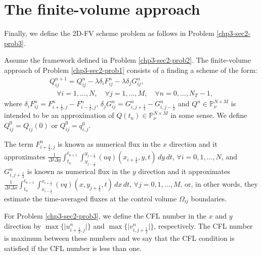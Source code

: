 \section{The finite-volume approach}
\label{sec:fv-2d}
Finally, we define the 2D-FV scheme problem as follows in Problem \ref{chp3-sec2-prob3}.
\begin{prob}[2D-FV scheme]
	\label{chp3-sec2-prob3}
	Assume the framework defined in Problem \ref{chp3-sec2-prob2}.
	The finite-volume approach of Problem \ref{chp3-sec2-prob1}
	consists of a finding a scheme of the form:
	\begin{align}
		\label{chp3-2dfv}
		{Q}_{ij}^{n+1} =  {Q}_{ij}^{n} - {\lambda} \delta_i {F}_{ij}^{n} - {\lambda} \delta_j {G}_{ij}^{n},
		\\ \nonumber \quad \forall i = 1, \ldots, N, \quad \forall j = 1, \ldots, M,
		\quad \forall n = 0, \ldots, N_T-1,
	\end{align}
	where $ \delta_i F_{ij}^n =
    {F}_{i+\frac{1}{2},j}^{n} 
    - {F}_{i-\frac{1}{2},j}^{n}$,
    $ \delta_j G_{ij}^n =
    {G}_{i,j+\frac{1}{2}}^{n} 
    - {G}_{i,j-\frac{1}{2}}^{n}$ 
    and ${Q}^{n}\in \mathbb{P}^{N\times M}_{\nu}$ is intended to be an approximation
	of ${Q}(t_{n})\in \mathbb{P}^{N\times M}_{\nu}$ in some sense. We define ${Q}_{ij}^{0} = {Q}_{ij}(0)$ or
	${Q}_{ij}^{0} = {q}^0_{i,j}$.
    
    The term ${F}_{i+\frac{1}{2}, j}^{n}$ is known as numerical flux in the 
    $x$ direction and it approximates
	$\frac{1}{\Delta t \Delta y}\int_{t_n}^{t_{n+1}} 
    \int_{y_{j-\frac{1}{2}}}^{y_{j+\frac{1}{2}}} 
    (uq)(x_{i+\frac{1}{2}}, y, t) \,dy \,dt $,
    $\forall i = 0, 1, \ldots, N$, and 
	${G}_{i, j+\frac{1}{2}}^{n}$ is known as numerical flux in the 
    $y$ direction and it approximates
	$\frac{1}{\Delta t \Delta x}\int_{t_n}^{t_{n+1}}  
    \int_{x_{i-\frac{1}{2}}}^{x_{i+\frac{1}{2}}}
    (vq)(x, y_{j+\frac{1}{2}}, t) \,dx \,dt $,
    $\forall j = 0, 1, \ldots, M$,
	or, in other words, they estimate the time-averaged
    fluxes at the control volume $\Omega_{ij}$ boundaries.
\end{prob}
\begin{remark}
For Problem \ref{chp3-sec2-prob3}, we define the CFL number in the $x$ and $y$ direction
by $\max \{{|u_{i+\frac{1}{2},j}^n}|\}$ and $\max \{ {|v_{i,j+\frac{1}{2}}^n}|\}$, respectively.
The CFL number is maximum between these numbers and we say that the CFL condition is
satisfied if the CFL number is less than one. 
\end{remark}


